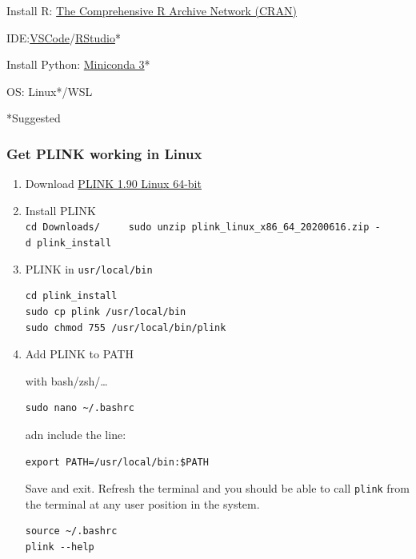 Install R: \href{https://cran.r-project.org/}{The Comprehensive R
  Archive Network (CRAN)}

IDE:\href{https://code.visualstudio.com/}{VSCode}/\href{https://posit.co/download/}{RStudio}*

Install Python:
\href{https://docs.anaconda.com/free/miniconda/index.html}{Miniconda 3}*

OS: Linux*/WSL

*Suggested

\hypertarget{get-plink-working-in-linux}{%
  \subsubsection{Get PLINK working in
    Linux}\label{get-plink-working-in-linux}}

\begin{enumerate}
  \def\labelenumi{\arabic{enumi}.}
  \item
        Download
        \href{https://s3.amazonaws.com/plink1-assets/plink_linux_x86_64_20231211.zip}{PLINK
          1.90 Linux 64-bit}
  \item
        Install PLINK
        \texttt{cd\ Downloads/\ \ \ \ \ sudo\ unzip\ plink\_linux\_x86\_64\_20200616.zip\ -d\ plink\_install}
  \item
        PLINK in \texttt{usr/local/bin}

        \begin{verbatim}
cd plink_install
sudo cp plink /usr/local/bin
sudo chmod 755 /usr/local/bin/plink
\end{verbatim}
  \item
        Add PLINK to PATH

        with bash/zsh/\ldots{}

        \begin{verbatim}
sudo nano ~/.bashrc
\end{verbatim}

        adn include the line:

        \begin{verbatim}
export PATH=/usr/local/bin:$PATH
\end{verbatim}

        Save and exit. Refresh the terminal and you should be able to call
        \texttt{plink} from the terminal at any user position in the system.

        \begin{verbatim}
source ~/.bashrc
plink --help
\end{verbatim}
\end{enumerate}

